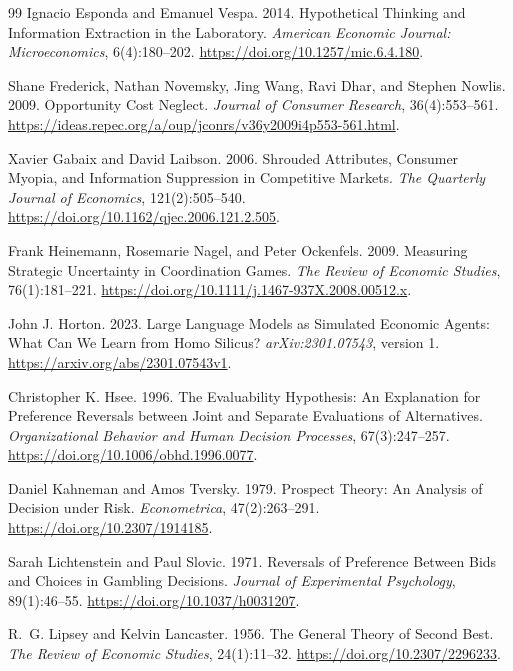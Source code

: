 \documentclass[11pt]{article}
\begin{document}
{\begin{thebibliography}{99}
Ignacio Esponda and Emanuel Vespa. 2014.
Hypothetical Thinking and Information Extraction in the Laboratory.
\emph{American Economic Journal: Microeconomics}, 6(4):180--202.
\url{https://doi.org/10.1257/mic.6.4.180}.

Shane Frederick, Nathan Novemsky, Jing Wang, Ravi Dhar, and Stephen Nowlis. 2009.
Opportunity Cost Neglect.
\emph{Journal of Consumer Research}, 36(4):553--561.
\url{https://ideas.repec.org/a/oup/jconrs/v36y2009i4p553-561.html}.

 Xavier Gabaix and David Laibson. 2006. Shrouded Attributes, Consumer Myopia, and Information Suppression in Competitive Markets. \emph{The Quarterly Journal of Economics}, 121(2):505--540. \url{https://doi.org/10.1162/qjec.2006.121.2.505}.

Frank Heinemann, Rosemarie Nagel, and Peter Ockenfels. 2009.
Measuring Strategic Uncertainty in Coordination Games.
\emph{The Review of Economic Studies}, 76(1):181--221.
\url{https://doi.org/10.1111/j.1467-937X.2008.00512.x}.

John J. Horton. 2023.
Large Language Models as Simulated Economic Agents: What Can We Learn from Homo Silicus?
\emph{arXiv:2301.07543}, version 1.
\url{https://arxiv.org/abs/2301.07543v1}.

Christopher K. Hsee. 1996.
The Evaluability Hypothesis: An Explanation for Preference Reversals between Joint and Separate Evaluations of Alternatives.
\emph{Organizational Behavior and Human Decision Processes}, 67(3):247--257.
\url{https://doi.org/10.1006/obhd.1996.0077}.

Daniel Kahneman and Amos Tversky. 1979.
Prospect Theory: An Analysis of Decision under Risk.
\emph{Econometrica}, 47(2):263--291.
\url{https://doi.org/10.2307/1914185}.

Sarah Lichtenstein and Paul Slovic. 1971.
Reversals of Preference Between Bids and Choices in Gambling Decisions.
\emph{Journal of Experimental Psychology}, 89(1):46--55.
\url{https://doi.org/10.1037/h0031207}.

 R.~G. Lipsey and Kelvin Lancaster. 1956. The General Theory of Second Best. \emph{The Review of Economic Studies}, 24(1):11--32. \url{https://doi.org/10.2307/2296233}.


\end{thebibliography}}
\end{document}
